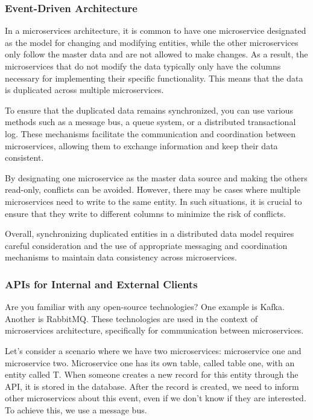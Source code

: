 \subsubsection{Event-Driven Architecture}

In a microservices architecture, it is common to have one microservice
designated as the model for changing and modifying entities, while the
other microservices only follow the master data and are not allowed to
make changes. As a result, the microservices that do not modify the data
typically only have the columns necessary for implementing their
specific functionality. This means that the data is duplicated across
multiple microservices.

To ensure that the duplicated data remains synchronized, you can use
various methods such as a message bus, a queue system, or a distributed
transactional log. These mechanisms facilitate the communication and
coordination between microservices, allowing them to exchange
information and keep their data consistent.

By designating one microservice as the master data source and making the
others read-only, conflicts can be avoided. However, there may be cases
where multiple microservices need to write to the same entity. In such
situations, it is crucial to ensure that they write to different columns
to minimize the risk of conflicts.

Overall, synchronizing duplicated entities in a distributed data model
requires careful consideration and the use of appropriate messaging and
coordination mechanisms to maintain data consistency across
microservices.

\subsubsection{APIs for Internal and External Clients}

Are you familiar with any open-source technologies? One example is
Kafka. Another is RabbitMQ. These technologies are used in the context
of microservices architecture, specifically for communication between
microservices.

Let's consider a scenario where we have two microservices: microservice
one and microservice two. Microservice one has its own table, called
table one, with an entity called T. When someone creates a new record
for this entity through the API, it is stored in the database. After the
record is created, we need to inform other microservices about this
event, even if we don't know if they are interested. To achieve this, we
use a message bus.

